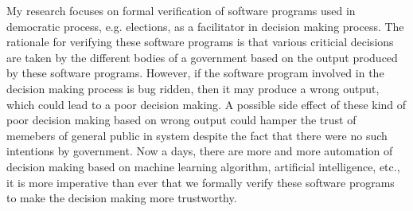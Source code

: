 \documentclass{article}
\begin{document}
My research focuses on formal verification of software programs used in  democratic process, e.g. elections, 
as a facilitator in decision making process. The rationale for verifying these software programs is that various 
criticial decisions are taken by the different bodies of a government based on the output produced by these software programs. However, if the 
software program involved in the decision making process is bug ridden, then it may produce a wrong 
output, which could lead to a poor decision making.  A possible side effect of these kind of poor 
decision making based on wrong output  could hamper the trust of  memebers of 
general public in system despite the fact that there were no such intentions by government. 
Now a days, there are more and more automation of decision making based on machine learning algorithm, 
artificial intelligence, etc.,  it is more imperative than ever  that  we formally verify these software programs
to make the decision making more trustworthy. 
\end{document}
